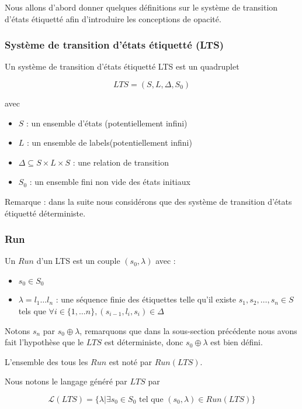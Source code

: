 \documentclass[10pt,a4paper]{article}
\begin{document}
Nous allons d'abord donner quelques d\'efinitions sur le syst\`eme de transition d'\'etats \'etiquett\'e afin d'introduire les conceptions de opacit\'e.

\subsubsection{Syst\`eme de transition d'\'etats \'etiquett\'e (LTS)}

Un syst\`eme de transition d'\'etats \'etiquett\'e LTS est un quadruplet 

$$LTS = (S,L,\Delta,S_0)$$

avec
\begin{itemize}
	\item $S$ : un ensemble d'\'etats (potentiellement infini)
	\item $L$ : un ensemble de labels(potentiellement infini)
	\item $\Delta \subseteq S\times L \times S$ : une relation de transition
	\item $S_0$ : un ensemble fini non vide des \'etats initiaux 
\end{itemize}

Remarque : dans la suite nous consid\'erons que des syst\`eme de transition d'\'etats \'etiquett\'e d\'eterministe.

\subsubsection{Run}

Un $Run$ d'un LTS est un couple $(s_0,\lambda)$ avec :

\begin{itemize}
	\item $s_0 \in S_0$
	\item $\lambda = l_1 \dots l_n$ : une s\'equence finie des \'etiquettes telle qu'il existe $s_1,s_2,\dots ,s_n \in S$ tels que $\forall i \in \{1, \dots n\}, (s_{i-1},l_i,s_i) \in \Delta$ 
\end{itemize}

Notons $s_n$ par $s_0\oplus \lambda$, remarquons que dans la sous-section pr\'ec\'edente nous avons fait l'hypoth\`ese que le $LTS$ est d\'eterministe, donc $s_0\oplus \lambda$ est bien d\'efini.

L'ensemble des tous les $Run$ est not\'e par $Run(LTS)$.

Nous notons le langage g\'en\'er\'e par $LTS$ par 

$$\mathcal{L}(LTS) = \{\lambda | \exists s_0 \in S_0 \mbox{ tel que } (s_0,\lambda) \in Run(LTS)\}$$
\end{document}
